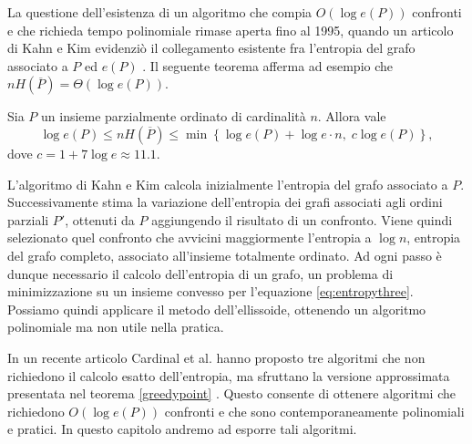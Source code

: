 La questione dell'esistenza di un algoritmo che compia \(O(\log{e(P)})\) confronti e che richieda tempo polinomiale rimase aperta fino al 1995, quando un articolo di Kahn e Kim evidenziò il collegamento esistente fra l'entropia del grafo associato a \(P\) ed \(e(P)\) \cite{Kahn1995}. Il seguente teorema afferma ad esempio che \(nH(\overline{P})=\Theta(\log{e(P)})\). 
\begin{theorem}
	 \label{kktheorem} Sia \(P\) un insieme parzialmente ordinato di cardinalità \(n\). Allora vale
	\[\log{e(P)}\le nH\left(\overline{P}\right)\le\min\left\{\log{e(P)}+\log{e\cdot n},\; c\log{e(P)}\right\},\]
	dove \(c=1+7\log{e}\approx 11.1\). 
\end{theorem}
L'algoritmo di Kahn e Kim calcola inizialmente l'entropia del grafo associato a \(P\). Successivamente stima la variazione dell'entropia dei grafi associati agli ordini parziali \(P'\), ottenuti da \(P\) aggiungendo il risultato di un confronto. Viene quindi selezionato quel confronto che avvicini maggiormente l'entropia a \(\log{n}\), entropia del grafo completo, associato all'insieme totalmente ordinato. Ad ogni passo è dunque necessario il calcolo dell'entropia di un grafo, un problema di minimizzazione su un insieme convesso per l'equazione \ref{eq:entropythree}. Possiamo quindi applicare il metodo dell'ellissoide, ottenendo un algoritmo polinomiale ma non utile nella pratica.

In un recente articolo Cardinal et al. hanno proposto tre algoritmi che non richiedono il calcolo esatto dell'entropia, ma sfruttano la versione approssimata presentata nel teorema \ref{greedypoint} \cite{Cardinal2010}. Questo consente di ottenere algoritmi che richiedono \(O(\log{e(P)})\) confronti e che sono contemporaneamente polinomiali e pratici. In questo capitolo andremo ad esporre tali algoritmi.

